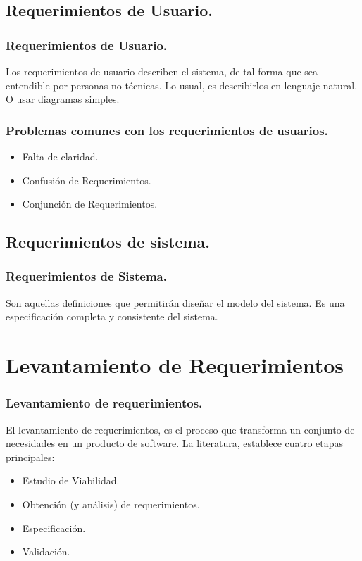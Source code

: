 \documentclass[12pt]{beamer}
\begin{document}
\subsection{Requerimientos de Usuario.}
\begin{frame}
\frametitle{Requerimientos de Usuario.}
Los requerimientos de usuario describen el sistema, de tal forma que sea entendible por personas no técnicas. Lo usual, es describirlos en lenguaje natural. O usar diagramas simples.
\end{frame}


\begin{frame}
\frametitle{Problemas comunes con los requerimientos de usuarios.}
\begin{itemize}
 \item<2-> Falta de claridad.
 \item<3-> Confusión de Requerimientos.
 \item<4-> Conjunción de Requerimientos.
\end{itemize}
\end{frame}


\subsection{Requerimientos de sistema.}
\begin{frame}
\frametitle{Requerimientos de Sistema.}
Son aquellas definiciones que permitirán diseñar el modelo del sistema.
Es una especificación completa y consistente del sistema.
\end{frame}


\section{Levantamiento de Requerimientos}
\begin{frame}
\frametitle{Levantamiento de requerimientos.}
El levantamiento de requerimientos, es el proceso que transforma un conjunto de necesidades en un producto de software.
La literatura, establece cuatro etapas principales:
\begin{itemize}
 \item<2-> Estudio de Viabilidad.
 \item<3-> Obtención (y análisis) de requerimientos.
 \item<4-> Especificación.
 \item<5-> Validación.
\end{itemize}
\end{frame}
\end{document}
